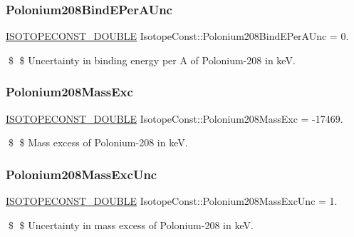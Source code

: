 \subsubsection{\texorpdfstring{Polonium208\+Bind\+E\+Per\+A\+Unc}{Polonium208BindEPerAUnc}}
{\footnotesize\ttfamily \mbox{\hyperlink{group___isotope_const-_macros_ga8f45a7272ce02c0b4c65c44636ed719a}{I\+S\+O\+T\+O\+P\+E\+C\+O\+N\+S\+T\+\_\+\+D\+O\+U\+B\+LE}} Isotope\+Const\+::\+Polonium208\+Bind\+E\+Per\+A\+Unc = 0.}

\$ \$ Uncertainty in binding energy per A of Polonium-\/208 in keV. \mbox{\label{group___isotope_const-_polonium-_po208_ga9eacea449a6b2a9767123df6db94b894}} 
\subsubsection{\texorpdfstring{Polonium208\+Mass\+Exc}{Polonium208MassExc}}
{\footnotesize\ttfamily \mbox{\hyperlink{group___isotope_const-_macros_ga8f45a7272ce02c0b4c65c44636ed719a}{I\+S\+O\+T\+O\+P\+E\+C\+O\+N\+S\+T\+\_\+\+D\+O\+U\+B\+LE}} Isotope\+Const\+::\+Polonium208\+Mass\+Exc = -\/17469.}

\$ \$ Mass excess of Polonium-\/208 in keV. \mbox{\label{group___isotope_const-_polonium-_po208_gac49d9b8cb3e61f77f4d9b2424881a5d2}} 
\subsubsection{\texorpdfstring{Polonium208\+Mass\+Exc\+Unc}{Polonium208MassExcUnc}}
{\footnotesize\ttfamily \mbox{\hyperlink{group___isotope_const-_macros_ga8f45a7272ce02c0b4c65c44636ed719a}{I\+S\+O\+T\+O\+P\+E\+C\+O\+N\+S\+T\+\_\+\+D\+O\+U\+B\+LE}} Isotope\+Const\+::\+Polonium208\+Mass\+Exc\+Unc = 1.}

\$ \$ Uncertainty in mass excess of Polonium-\/208 in keV. \mbox{\label{group___isotope_const-_polonium-_po208_ga91fc546791030041e203716a948b1eab}} 
